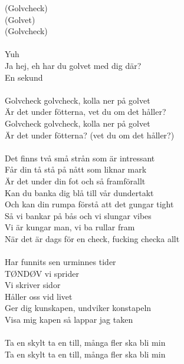 \documentclass[a6paper, 10pt, twoside]{article}
\begin{document}
\begin{center}
\end{center}
\begin{lyrics}
(Golvcheck)\\
(Golvet)\\
(Golvcheck)\\
\vspace{5pt}\\
Yuh\\
Ja hej, eh har du golvet med dig där?\\
En sekund\\
\vspace{5pt}\\
Golvcheck golvcheck, kolla ner på golvet\\
Är det under fötterna, vet du om det håller?\\
Golvcheck golvcheck, kolla ner på golvet\\
Är det under fötterna? (vet du om det håller?)\\
\vspace{5pt}\\
Det finns två små strån som är intressant\\
Får din tå stå på nått som liknar mark\\
Är det under din fot och så framförallt\\
Kan du banka dig blå till vår dundertakt\\
Och kan din rumpa förstå att det gungar tight\\
Så vi bankar på bås och vi slungar vibes\\
Vi är kungar man, vi ba rullar fram\\
När det är dags för en check, fucking checka allt\\
\vspace{5pt}\\
Har funnits sen urminnes tider\\
TØNDØV vi sprider\\
Vi skriver sidor\\
Håller oss vid livet\\
Ger dig kunskapen, undviker konstapeln\\
Visa mig kapen så lappar jag taken\\
\vspace{5pt}\\
Ta en skylt ta en till, många fler ska bli min\\
Ta en skylt ta en till, många fler ska bli min\\

\end{lyrics}
\end{document}
